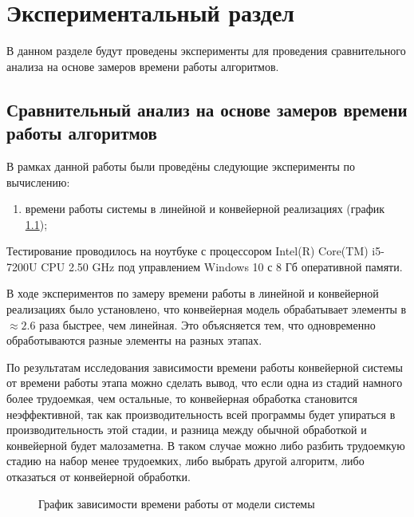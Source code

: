 \chapter{Экспериментальный раздел}
\label{cha:research}
    В данном разделе будут проведены эксперименты для проведения 
    сравнительного анализа на основе замеров времени работы алгоритмов.

    \section{Сравнительный анализ на основе замеров времени работы алгоритмов}
        В рамках данной работы были проведёны следующие эксперименты по вычислению: 
        \begin{enumerate}
            \item времени работы системы в линейной и конвейерной реализациях (график \ref{graph:test:models});
        \end{enumerate}

        Тестирование проводилось на ноутбуке с процессором
        Intel(R) Core(TM) i5-7200U CPU 2.50 GHz \cite{processor-i5-7200u}
        под управлением Windows 10 с 8 Гб оперативной памяти.

        В ходе экспериментов по замеру времени работы в линейной и конвейерной реализациях было установлено,
        что конвейерная модель обрабатывает элементы в $ \approx 2.6 $ раза
        быстрее, чем линейная. Это объясняется тем,
        что одновременно обработываются разные элементы на разных этапах.
        
        По результатам исследования зависимости времени работы конвейерной системы от времени работы этапа  
        можно сделать вывод, что если одна из стадий намного более трудоемкая, чем остальные,
        то конвейерная обработка становится неэффективной,
        так как производительность всей программы будет упираться в производительность этой стадии,
        и разница между обычной обработкой и конвейерной будет малозаметна.
        В таком случае можно либо разбить трудоемкую стадию на набор менее трудоемких,
        либо выбрать другой алгоритм, либо отказаться от конвейерной обработки.


    \begin{figure}[h!]
        \centering
        \caption{График зависимости времени работы от модели системы} 
        \label{graph:test:models}
    \end{figure}


\newpage